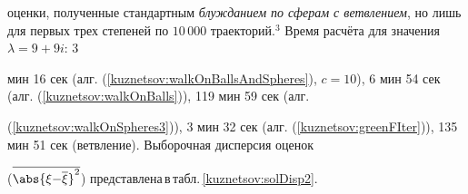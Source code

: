 оценки,  полученные стандартным \emph{блужданием по сферам с ветвлением},  но лишь для первых трех степеней по $10\, 000$ траекторий.\!\!$^3$ Время расчёта для значения $\lambda=9+9i$: 3

мин 16 сек (алг. (\ref{kuznetsov:walkOnBallsAndSpheres}),  $c=10$),  6 мин 54 сек \linebreak (алг. (\ref{kuznetsov:walkOnBalls})),  119 мин 59 сек (алг.

(\ref{kuznetsov:walkOnSpheres3})),  3 мин 32 сек (алг. (\ref{kuznetsov:greenFIter})),  135 мин 51 сек (ветвление). Выборочная дисперсия оценок

($\overline{\abs{\xi{-}\overline\xi}^2}$) \mbox{представлена\,в\,табл.\,\ref{kuznetsov:solDisp2}.}



